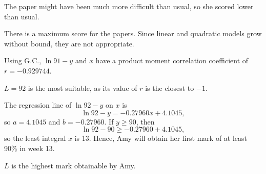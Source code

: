 \clearpage
\begin{solution}
    \begin{ppart}
        \begin{figure}[H]
            \centering
        \end{figure}
    \end{ppart}
    \begin{ppart}
        The paper might have been much more difficult than usual, so she scored lower than usual.
    \end{ppart}
    \begin{ppart}
        There is a maximum score for the papers. Since linear and quadratic models grow without bound, they are not appropriate.
    \end{ppart}
    \begin{ppart}
        Using G.C., $\ln{91-y}$ and $x$ have a product moment correlation coefficient of $r = -0.929744$.
    \end{ppart}
    \begin{ppart}
        $L = 92$ is the most suitable, as its value of $r$ is the closest to $-1$.
    \end{ppart}
    \begin{ppart}
        The regression line of $\ln{92-y}$ on $x$ is \[\ln{92-y} = -0.27960x + 4.1045,\] so $a = 4.1045$ and $b = -0.27960$. If $y \geq 90$, then \[\ln{92 - 90}  \geq -0.27960 + 4.1045,\] so the least integral $x$ is 13. Hence, Amy will obtain her first mark of at least 90\% in week 13.
    \end{ppart}
    \begin{ppart}
        $L$ is the highest mark obtainable by Amy.
    \end{ppart}
\end{solution}


